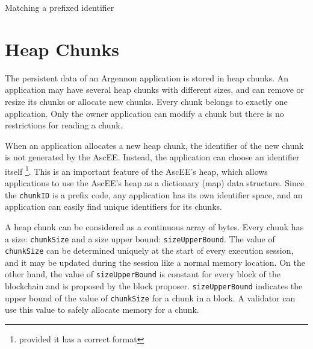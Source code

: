 \begin{algorithm}[h]
    \DontPrintSemicolon
    \BlankLine
    \BlankLine
    {
        {
            \;
        }
    }
    \;
    \caption{Matching a prefixed identifier}\label{alg:match_id}
\end{algorithm}


\section{Heap Chunks}\label{heap}

The persistent data of an Argennon application is stored in heap chunks. An application may have several heap chunks
with different sizes, and can remove or
resize its chunks or allocate new chunks. Every chunk belongs to exactly one application. Only the owner application can
modify a chunk but there is no restrictions for reading a chunk.

When an application allocates a new heap chunk, the identifier of the new chunk is not generated by
the AscEE. Instead, the application can choose an identifier itself \footnote{provided it has a correct format}. This
is an important feature of the AscEE's heap, which allows applications to use the AscEE's heap as a dictionary (map)
data structure.
Since the \texttt{chunkID} is a prefix code, any application has its own identifier space, and an application
can easily find unique identifiers for its chunks.

A heap chunk can be considered as a continuous
array of bytes. Every chunk has a size: \texttt{chunkSize} and a size upper bound: \texttt{sizeUpperBound}. The value of
\texttt{chunkSize} can be determined uniquely at
the start of
every execution session, and it may be updated during the session like a normal memory location. On the other hand,
the value of \texttt{sizeUpperBound} is constant for every block of the blockchain and is proposed by the block
proposer. \texttt{sizeUpperBound} indicates the upper bound of the value of \texttt{chunkSize} for a chunk in a block.
A validator can use this value to safely allocate memory for a chunk.

